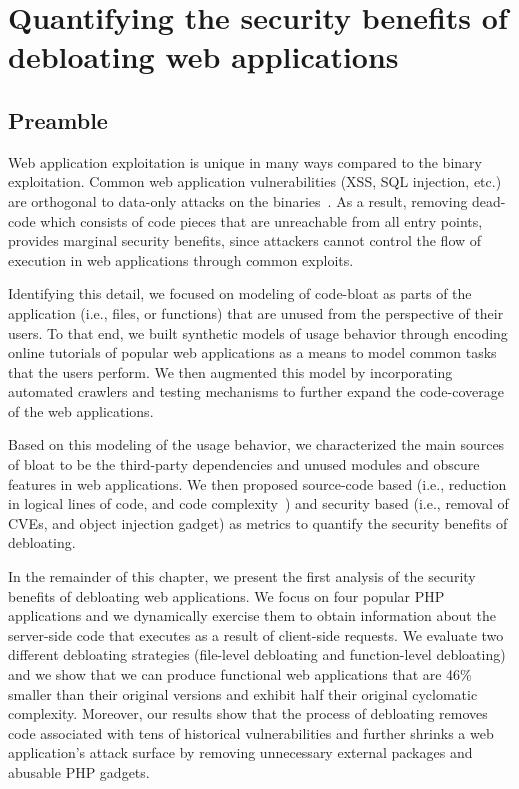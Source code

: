 \chapter{Quantifying the security benefits of debloating web applications}
\label{chap:lim}

\section*{Preamble}
Web application exploitation is unique in many ways compared to the binary exploitation. 
Common web application vulnerabilities (XSS, SQL injection, etc.) are orthogonal to data-only attacks on the binaries~\cite{ispoglou2018block}. 
As a result, removing dead-code which consists of code pieces that are unreachable from all entry points, provides marginal security benefits, since attackers cannot control the flow of execution in web applications through common exploits. 

Identifying this detail, we focused on modeling of code-bloat as parts of the application (i.e., files, or functions) that are unused from the perspective of their users. 
To that end, we built synthetic models of usage behavior through encoding online tutorials of popular web applications as a means to model common tasks that the users perform. 
We then augmented this model by incorporating automated crawlers and testing mechanisms to further expand the code-coverage of the web applications. 

Based on this modeling of the usage behavior, we characterized the main sources of bloat to be the third-party dependencies and unused modules and obscure features in web applications. 
We then proposed source-code based (i.e., reduction in logical lines of code, and code complexity~\cite{gill1991cyclomatic}) and security based (i.e., removal of CVEs, and object injection gadget) as metrics to quantify the security benefits of debloating. 

In the remainder of this chapter, we present the first analysis of the security benefits of debloating web applications. 
We focus on four popular PHP applications and
we dynamically exercise them to obtain information about the server-side code
that executes as a result of client-side requests. We evaluate two different
debloating strategies (file-level debloating and function-level debloating)
and we show that we can produce functional web applications that are 46\%
smaller than their original versions and exhibit half their original cyclomatic
complexity. Moreover, our results show that the process of debloating removes
code associated with tens of historical vulnerabilities and further shrinks
a web application's attack surface by removing unnecessary external packages
and abusable PHP gadgets.

